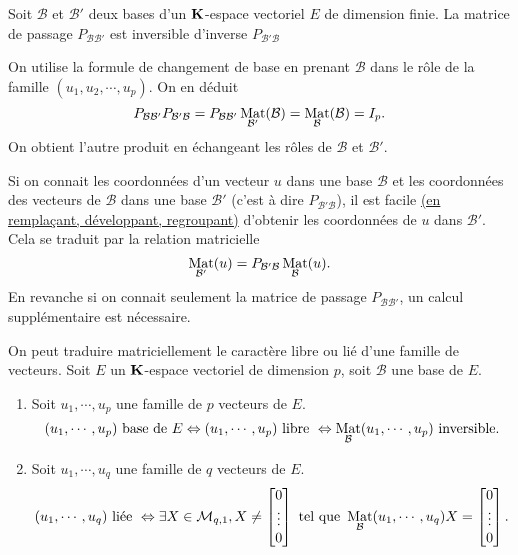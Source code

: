 \begin{propn} \label{prop: passinv}
Soit $\mathcal B$ et $\mathcal B'$ deux bases d'un $\mathbf{K}$-espace vectoriel $E$ de dimension finie. La matrice de passage $P_{\mathcal B \mathcal B'}$ est inversible d'inverse $P_{\mathcal B' \mathcal B}$
\end{propn}
\begin{demo}
 On utilise la formule de changement de base en prenant $\mathcal{B}$ dans le rôle de la famille $(u_1,u_2,\cdots,u_p)$. On en déduit
\begin{displaymath}
 P_{\mathcal B \mathcal B'}P_{\mathcal B' \mathcal B}=P_{\mathcal B \mathcal B'}\mathop{\mathrm{Mat}}_{\mathcal B'}(\mathcal B)= \mathop{\mathrm{Mat}}_{\mathcal B}(\mathcal B) = I_p.
\end{displaymath}
On obtient l'autre produit en échangeant les rôles de $\mathcal{B}$ et $\mathcal{B}'$.
\end{demo}
\begin{rem}
 Si on connait les coordonnées d'un vecteur $u$ dans une base $\mathcal B$ et les coordonnées des vecteurs de $\mathcal B$ dans une base $\mathcal B'$ (c'est à dire $P_{\mathcal B' \mathcal B}$), il est facile \href{https://maquisdoc-math.fra1.digitaloceanspaces.com/C2233_3.pdf}{(en remplaçant, développant, regroupant)} d'obtenir les coordonnées de $u$ dans $\mathcal B'$. Cela se traduit par la relation matricielle
\begin{displaymath}
 \mathop{\mathrm{Mat}}_{\mathcal B'} (u) = P_{\mathcal B' \mathcal B}\mathop{\mathrm{Mat}}_\mathcal B (u).
\end{displaymath}
En revanche si on connait seulement la matrice de passage $P_{\mathcal B \mathcal B'}$, un calcul supplémentaire est nécessaire.
\end{rem}
\begin{rems}
On peut traduire matriciellement le caractère libre ou lié d'une famille de vecteurs. Soit $E$ un $\mathbf{K}$-espace vectoriel de dimension $p$, soit $\mathcal B$ une base de $E$.
 \begin{enumerate}
  \item Soit $u_1,\cdots,u_p$ une famille de $p$ vecteurs de $E$.
\begin{displaymath}
(u_1,\cdots,u_p)\text{ base de } E \Leftrightarrow (u_1,\cdots,u_p)\text{ libre }
\Leftrightarrow \mathop{\mathrm{Mat}}_\mathcal B(u_1,\cdots,u_p) \text{ inversible}.
\end{displaymath}
\item Soit $u_1,\cdots,u_q$ une famille de $q$ vecteurs de $E$.
\begin{displaymath}
(u_1,\cdots,u_q)\text{ liée }
\Leftrightarrow \exists X\in \mathcal M_{q,1}, 
X\neq
\begin{bmatrix}
  0\\
  \vdots\\
 0
\end{bmatrix} 
\text{ tel que }
\mathop{\mathrm{Mat}}_\mathcal B(u_1,\cdots,u_q)X=
\begin{bmatrix}
  0\\
  \vdots\\
 0
\end{bmatrix} .
\end{displaymath}
\end{enumerate}
\end{rems}


